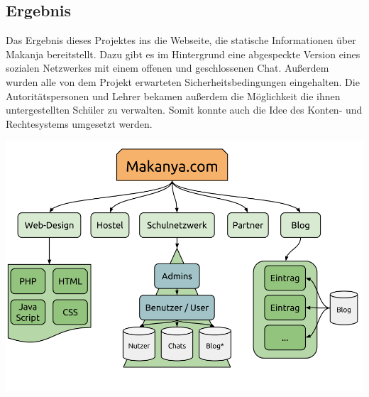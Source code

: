 


\subsection{Ergebnis} %
Das Ergebnis dieses Projektes ins die Webseite, die statische Informationen über Makanja bereitstellt.
Dazu gibt es im Hintergrund eine abgespeckte Version eines sozialen Netzwerkes mit einem offenen und geschlossenen Chat.
Außerdem wurden alle von dem Projekt erwarteten Sicherheitsbedingungen eingehalten.
Die Autoritätspersonen und Lehrer bekamen außerdem die Möglichkeit die ihnen untergestellten Schüler zu verwalten.
Somit konnte auch die Idee des Konten- und Rechtesystems umgesetzt werden.
\begin{center}
\includegraphics[width=\linewidth]{imgs/makanyaOverview.png}
\end{center}
